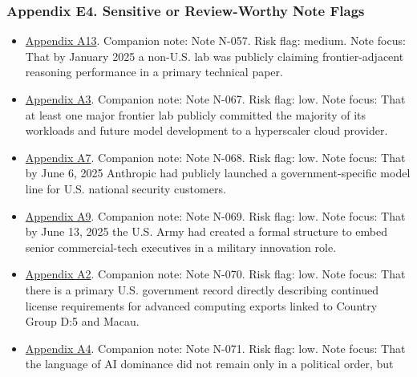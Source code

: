 \documentclass[
  american,
  11pt,
  letterpaper,
]{article}
\providecommand{\tightlist}{%
  \setlength{\itemsep}{0pt}\setlength{\parskip}{0pt}}
\begin{document}
\subsubsection{Appendix E4. Sensitive or Review-Worthy Note
Flags}\label{ch-07-appendix-e4-sensitive-or-review-worthy-note-flags}

\begin{itemize}
\tightlist
\item
  \hyperref[ch-07-appendix-a13-deepseek-r1-incentivizing-reasoning-capability-in-llms-via-reinforcement-learning]{Appendix
  A13}. Companion note: Note N-057. Risk flag: medium. Note focus: That
  by January 2025 a non-U.S. lab was publicly claiming frontier-adjacent
  reasoning performance in a primary technical paper.
\item
  \hyperref[ch-07-appendix-a3-amazon-and-anthropic-announce-strategic-collaboration-to-advance-generative-ai]{Appendix
  A3}. Companion note: Note N-067. Risk flag: low. Note focus: That at
  least one major frontier lab publicly committed the majority of its
  workloads and future model development to a hyperscaler cloud
  provider.
\item
  \hyperref[ch-07-appendix-a7-claude-gov-models-for-u-s-national-security-customers]{Appendix
  A7}. Companion note: Note N-068. Risk flag: low. Note focus: That by
  June 6, 2025 Anthropic had publicly launched a government-specific
  model line for U.S. national security customers.
\item
  \hyperref[ch-07-appendix-a9-army-launches-detachment-201-executive-innovation-corps-to-drive-tech-transformation]{Appendix
  A9}. Companion note: Note N-069. Risk flag: low. Note focus: That by
  June 13, 2025 the U.S. Army had created a formal structure to embed
  senior commercial-tech executives in a military innovation role.
\item
  \hyperref[ch-07-appendix-a2-guidance-regarding-enforcement-of-license-requirements-for-advanced-computing-items-for-entities-headquartered-in-country-group-d-5-and-macau]{Appendix
  A2}. Companion note: Note N-070. Risk flag: low. Note focus: That
  there is a primary U.S. government record directly describing
  continued license requirements for advanced computing exports linked
  to Country Group D:5 and Macau.
\item
  \hyperref[ch-07-appendix-a4-request-for-information-on-the-development-of-an-artificial-intelligence-ai-action-plan]{Appendix
  A4}. Companion note: Note N-071. Risk flag: low. Note focus: That the
  language of AI dominance did not remain only in a political order, but

\end{itemize}
\end{document}

